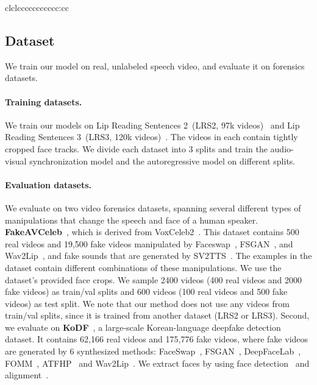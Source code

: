 \documentclass[10pt,twocolumn,letterpaper]{article}
\newcommand{\mypar}[1]{\vspace{-3mm}\paragraph{#1}}
\begin{document}
\begin{table*}[t!]
{\begin{tabular}{clclccccccccccc:cc}
\bottomrule
\end{tabular}
}
\caption{\textbf{Manipulation detection on FakeAVCeleb.} We report AP scores  and AUC scores , following the evaluation protocol of Haliassos et al.~\cite{haliassos2021lips}, in which supervised methods are evaluated on unseen manipulation types (unsupervised methods are not trained with labels and fake examples). We report results with combinations of real/fake video/audio, using different manipulation algorithms. We report the average performance over four fake video~(FV) categories in AVG-FV. We retrained all supervised models on FakeAVCeleb~\cite{NEURIPS_DATASETS_AND_BENCHMARKS2021_d9d4f495}.}
\label{comparison_with_others}
\end{table*}
 
\subsection{Dataset}
We train our model on real, unlabeled speech video, and evaluate it on forensics datasets.

\mypar{Training datasets.} We train our models on Lip Reading Sentences 2~(LRS2, 97k videos)~\cite{Afouras18c} and Lip Reading Sentences 3~(LRS3, 120k videos)~\cite{afouras2018lrs3}. The videos in each contain tightly cropped face tracks. We divide each dataset into 3 splits and train the audio-visual synchronization model and the autoregressive model on different splits.




\mypar{Evaluation datasets.} 
We evaluate on two video forensics datasets, spanning several different types of manipulations that change the speech and face of a human speaker. 
\textbf{FakeAVCeleb}~\cite{NEURIPS_DATASETS_AND_BENCHMARKS2021_d9d4f495}, which is derived from VoxCeleb2~\cite{chung2018voxceleb2}. This dataset contains 500 real videos and 19,500 fake videos manipulated by Faceswap~\cite{korshunova2017fast}, FSGAN~\cite{nirkin2019fsgan}, and Wav2Lip~\cite{prajwal2020lip}, and fake sounds that are generated by SV2TTS~\cite{jia2018transfer}. The examples in the dataset contain different combinations of these manipulations. We use the dataset's provided face crops. We sample 2400 videos (400 real videos and 2000 fake videos) as train/val splits and 600 videos (100 real videos and 500 fake videos) as test split. We note that our method does not use any videos from train/val splits, since it is trained from another dataset (LRS2 or LRS3). Second, we evaluate on \textbf{KoDF}~\cite{kwon2021kodf}, a large-scale Korean-language deepfake detection dataset. It contains 62,166 real videos and 175,776 fake videos, where fake videos are generated by 6 synthesized methods: FaceSwap~\cite{faceswap}, FSGAN~\cite{nirkin2019fsgan}, DeepFaceLab~\cite{perov2020deepfacelab}, FOMM~\cite{siarohin2019first}, ATFHP~\cite{yi2020audio} and Wav2Lip~\cite{prajwal2020lip}. We extract faces by using face detection~\cite{zhang2017s3fd} and alignment~\cite{bulat2017far}. 
\end{document}
